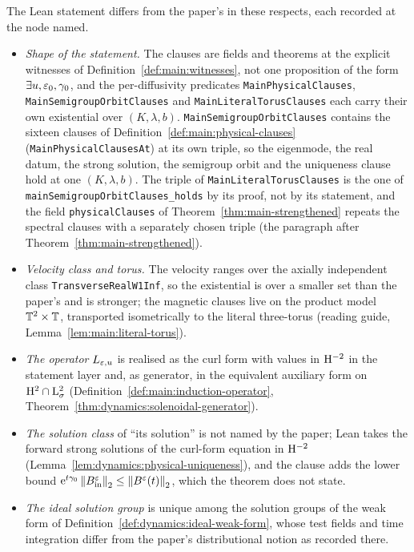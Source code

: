 The Lean statement differs from the paper's in these respects, each recorded at the node
named.
\begin{itemize}
  \item \emph{Shape of the statement.}  The clauses are fields and theorems at the explicit
    witnesses of Definition~\ref{def:main:witnesses}, not one proposition of the form
    $\exists u,\varepsilon_0,\gamma_0$, and the per-diffusivity predicates
    \texttt{MainPhysicalClauses}, \texttt{MainSemigroupOrbitClauses} and
    \texttt{MainLiteralTorusClauses} each carry their own existential over $(K,\lambda,b)$.
    \texttt{MainSemigroupOrbitClauses} contains the sixteen clauses of
    Definition~\ref{def:main:physical-clauses} (\texttt{MainPhysicalClausesAt}) at its own
    triple, so the eigenmode, the real datum, the strong solution, the semigroup orbit and the
    uniqueness clause hold at one $(K,\lambda,b)$.  The triple of
    \texttt{MainLiteralTorusClauses} is the one of \texttt{mainSemigroupOrbitClauses\_holds}
    by its proof, not by its statement, and the field \texttt{physicalClauses} of
    Theorem~\ref{thm:main-strengthened} repeats the spectral clauses with a separately chosen
    triple (the paragraph after Theorem~\ref{thm:main-strengthened}).
  \item \emph{Velocity class and torus.}  The velocity ranges over the axially independent
    class \texttt{TransverseRealW1Inf}, so the existential is over a smaller set than the
    paper's and is stronger; the magnetic clauses live on the product model $\mathbb{T}^2\times\mathbb{T}$,
    transported isometrically to the literal three-torus (reading guide,
    Lemma~\ref{lem:main:literal-torus}).
  \item \emph{The operator} $L_{\varepsilon,u}$ is realised as the curl form with values in
    $\mathrm{H}^{-2}$ in the statement layer and, as generator, in the equivalent auxiliary form on
    $\mathrm{H}^2\cap\mathrm{L}^2_\sigma$ (Definition~\ref{def:main:induction-operator},
    Theorem~\ref{thm:dynamics:solenoidal-generator}).
  \item \emph{The solution class} of ``its solution'' is not named by the paper; Lean takes the
    forward strong solutions of the curl-form equation in $\mathrm{H}^{-2}$
    (Lemma~\ref{lem:dynamics:physical-uniqueness}), and the clause adds the lower bound
    $\mathrm{e}^{t\gamma_0}\left\|B_{\rm in}^\varepsilon\right\|_2\leq\left\|B^\varepsilon(t)\right\|_2$, which the theorem does not
    state.
  \item \emph{The ideal solution group} is unique among the solution groups of the weak form
    of Definition~\ref{def:dynamics:ideal-weak-form}, whose test fields and time integration
    differ from the paper's distributional notion as recorded there.
\end{itemize}

